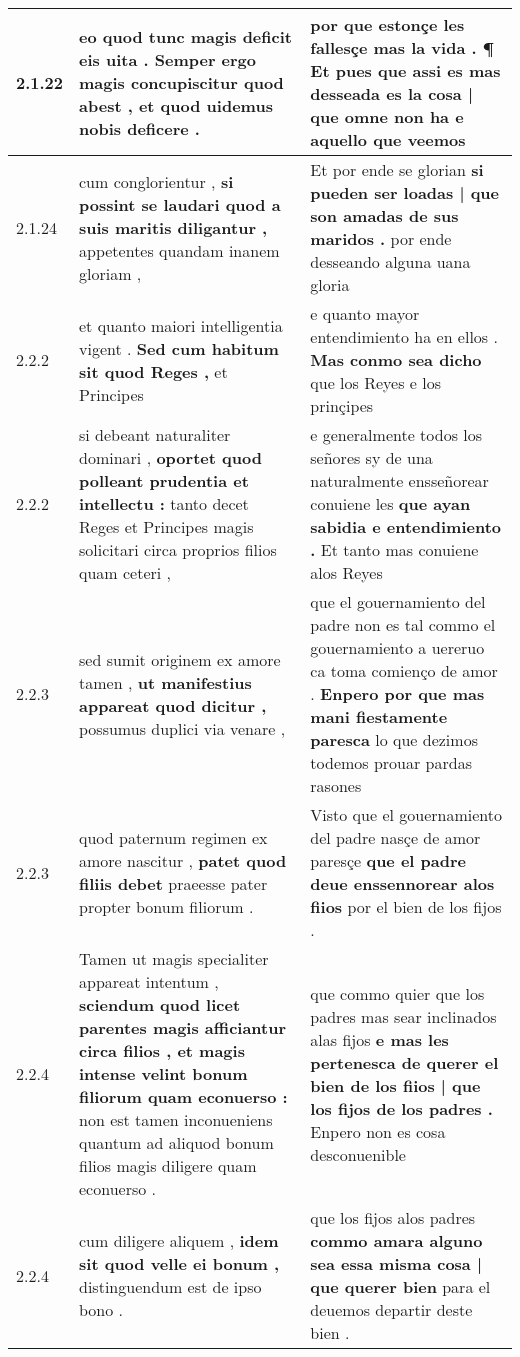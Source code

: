 \begin{tabular}{|p{1cm}|p{6.5cm}|p{6.5cm}|}
2.1.22 & eo quod tunc magis deficit eis uita . \textbf{ Semper ergo magis concupiscitur quod abest , } et quod uidemus nobis deficere . & por que estonçe les fallesçe \textbf{ mas la vida . ¶ Et pues que assi es mas desseada es la cosa | que omne non ha } e aquello que veemos \\\hline
2.1.24 & cum conglorientur , \textbf{ si possint se laudari quod a suis maritis diligantur , } appetentes quandam inanem gloriam , & Et por ende se glorian \textbf{ si pueden ser loadas | que son amadas de sus maridos . } por ende desseando alguna uana gloria \\\hline
2.2.2 & et quanto maiori intelligentia vigent . \textbf{ Sed cum habitum sit quod Reges , } et Principes & e quanto mayor entendimiento ha en ellos . \textbf{ Mas conmo sea dicho } que los Reyes e los prinçipes \\\hline
2.2.2 & si debeant naturaliter dominari , \textbf{ oportet quod polleant prudentia et intellectu : } tanto decet Reges et Principes magis solicitari circa proprios filios quam ceteri , & e generalmente todos los señores sy de una naturalmente ensseñorear conuiene les \textbf{ que ayan sabidia e entendimiento . } Et tanto mas conuiene alos Reyes \\\hline
2.2.3 & sed sumit originem ex amore tamen , \textbf{ ut manifestius appareat quod dicitur , } possumus duplici via venare , & que el gouernamiento del padre non es tal commo el gouernamiento a uereruo ca toma comienço de amor . \textbf{ Enpero por que mas mani fiestamente paresca } lo que dezimos todemos prouar pardas rasones \\\hline
2.2.3 & quod paternum regimen ex amore nascitur , \textbf{ patet quod filiis debet } praeesse pater propter bonum filiorum . & Visto que el gouernamiento del padre nasçe de amor paresçe \textbf{ que el padre deue enssennorear alos fiios } por el bien de los fijos . \\\hline
2.2.4 & Tamen ut magis specialiter appareat intentum , \textbf{ sciendum quod licet parentes magis afficiantur circa filios , et magis intense velint bonum filiorum quam econuerso : } non est tamen inconueniens quantum ad aliquod bonum filios magis diligere quam econuerso . & que commo quier que los padres mas sear inclinados alas fijos \textbf{ e mas les pertenesca de querer el bien de los fiios | que los fijos de los padres . } Enpero non es cosa desconuenible \\\hline
2.2.4 & cum diligere aliquem , \textbf{ idem sit quod velle ei bonum , } distinguendum est de ipso bono . & que los fijos alos padres \textbf{ commo amara alguno sea essa misma cosa | que querer bien } para el deuemos departir deste bien . \\\hline

\end{tabular}
